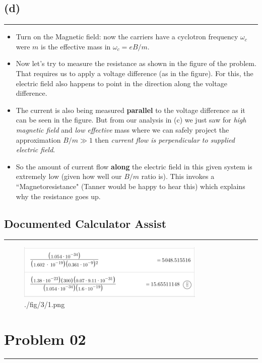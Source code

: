 \documentclass[letter, 10pts]{article}
\begin{document}
\subsection*{(d)} 
\hrule 
\begin{itemize}
	\item Turn on the Magnetic field: now the carriers have a cyclotron frequency $ \omega_c$ were $m$ is the effective mass in $\omega_c = e B / m$. 
	\item Now let's try to measure the resistance as shown in the figure of the problem. That requires us to apply a voltage difference (as in the figure). For this, the electric field also happens to point in the direction along the voltage difference. 
	\item The current is also being measured \textbf{parallel} to the voltage difference as it can be seen in the figure. But from our analysis in (c) we just saw for \emph{high magnetic field} and \emph{low effective} mass where we can safely project the approximation $ B / m \gg 1$ then \emph{current flow is perpendicular to supplied electric field}. 
	\item So the amount of current flow \textbf{along} the electric field in this given system is extremely low (given how well our $B / m$ ratio is). This invokes a ``Magnetoresistance" (Tanner would be happy to hear this) which explains why the resistance goes up. 
\end{itemize}

\subsection*{Documented Calculator Assist}
\hrule 
\begin{figure}[htpb]
	\centering
	\includegraphics[width=0.8\textwidth]{./fig/3/2.png}
	\caption{./fig/3/1.png}
	\label{fig:-fig-3-1-png}
\end{figure}
\section*{Problem 02}
\hrule 
\end{document}

